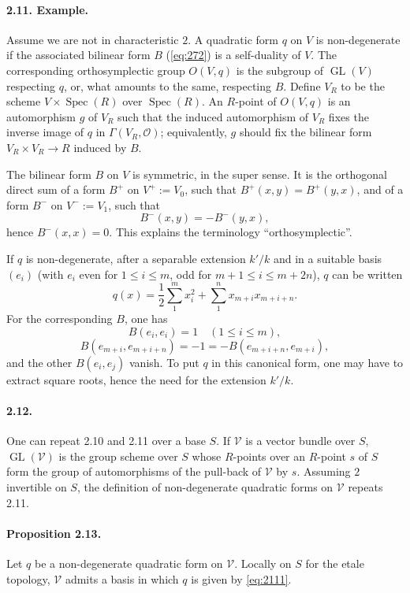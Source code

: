 \documentclass[11pt]{article}
\newcommand{\Spec}{\operatorname{Spec}}
\newcommand{\GL}{\operatorname{GL}}
\newcommand{\calO}{\mathcal O}
\begin{document}
\paragraph{2.11. Example.}
Assume we are not in characteristic $2$. A quadratic form $q$ on $V$ is non-degenerate if the associated bilinear form $B$ (\eqref{eq:272}) is a self-duality of $V$. The corresponding orthosymplectic group $O(V,q)$ is the subgroup of $\GL(V)$ respecting $q$, or, what amounts to the same, respecting $B$. Define $V_R$ to be the scheme $V\times\Spec(R)$ over $\Spec(R)$. An $R$-point of $O(V,q)$ is an automorphism $g$ of $V_R$ such that the induced automorphism of $V_R$ fixes the inverse image of $q$ in $\Gamma(V_R,\calO)$; equivalently, $g$ should fix the bilinear form $V_R\times V_R\to R$ induced by $B$.

The bilinear form $B$ on $V$ is symmetric, in the super sense. It is the orthogonal direct sum of a form $B^+$ on $V^+:=V_0$, such that $B^+(x,y)=B^+(y,x)$, and of a form $B^-$ on $V^-:=V_1$, such that
\[
B^-(x,y)=-B^-(y,x),
\]
hence $B^-(x,x)=0$. This explains the terminology ``orthosymplectic''.

If $q$ is non-degenerate, after a separable extension $k'/k$ and in a suitable basis $(e_i)$ (with $e_i$ even for $1\leq i\leq m$, odd for $m+1\leq i\leq m+2n$), $q$ can be written
\begin{equation}
\label{eq:2111}
q(x)=\frac12\sum_{1}^{m}x_i^2+\sum_{1}^{n}x_{m+i}x_{m+i+n}.
\end{equation}
For the corresponding $B$, one has
\begin{equation}
\label{eq:2112}
B(e_i,e_i)=1\quad (1\leq i\leq m),
\end{equation}
\[
B(e_{m+i},e_{m+i+n})=-1=-B(e_{m+i+n},e_{m+i}),
\]
and the other $B(e_i,e_j)$ vanish. To put $q$ in this canonical form, one may have to extract square roots, hence the need for the extension $k'/k$.

\paragraph{2.12.}
One can repeat 2.10 and 2.11 over a base $S$. If $\mathcal V$ is a vector bundle over $S$, $\GL(\mathcal V)$ is the group scheme over $S$ whose $R$-points over an $R$-point $s$ of $S$ form the group of automorphisms of the pull-back of $\mathcal V$ by $s$. Assuming $2$ invertible on $S$, the definition of non-degenerate quadratic forms on $\mathcal V$ repeats 2.11.

\paragraph{Proposition 2.13.}
Let $q$ be a non-degenerate quadratic form on $\mathcal V$. Locally on $S$ for the etale topology, $\mathcal V$ admits a basis in which $q$ is given by \eqref{eq:2111}.
\end{document}
